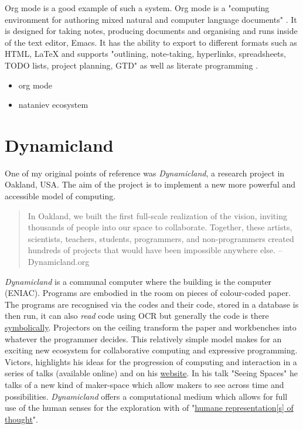 \documentclass[12pt]{report}
\begin{document}
Org mode is a good example of such a system. Org mode is a "computing
environment for authoring mixed natural and computer language documents"
\cite{Schulte:Davison:Dye:Dominik:2011:JSSOBK:v46i03}. It is designed for taking
notes, producing documents and organising and runs inside of the text editor,
Emacs. It has the ability to export to different formats such as HTML, \LaTeX{} and
supports "outlining, note-taking, hyperlinks, spreadsheets, TODO lists, project
planning, GTD" as well as literate programming
\cite{Schulte:Davison:Dye:Dominik:2011:JSSOBK:v46i03}.

\begin{itemize}
\item org mode
\item nataniev ecosystem
\end{itemize}

\section{Dynamicland}
\label{sec:orgd3cc1be}

One of my original points of reference was \emph{Dynamicland}, a research project in
Oakland, USA. The aim of the project is to implement a new more powerful and
accessible model of computing.

\begin{quote}


In Oakland, we built the first full-scale realization of the vision, inviting
thousands of people into our space to collaborate. Together, these artists,
scientists, teachers, students, programmers, and non-programmers created
hundreds of projects that would have been impossible anywhere else.
-- Dynamicland.org 
\end{quote}


\emph{Dynamicland} is a communal computer where the building is the computer (ENIAC).
Programs are embodied in the room on pieces of colour-coded paper. The programs
are recognised via the codes and their code, stored in a database is then run,
it can also \emph{read} code using OCR but generally the code is there \href{https://thenewstack.io/dynamicland-rethinks-computer-interfaces/}{symbolically}.
Projectors on the ceiling transform the paper and workbenches into whatever the
programmer decides. This relatively simple model makes for an exciting new
ecosystem for collaborative computing and expressive programming. Victors,
highlights his ideas for the progression of computing and interaction in a
series of talks (available online) and on his \href{http://worrydream.com}{website}. In his talk "Seeing
Spaces" he talks of a new kind of maker-space which allow makers to see across
time and possibilities. \emph{Dynamicland} offers a computational medium which allows
for full use of the human senses for the exploration with of "\href{https://vimeo.com/115154289}{humane
representation[s] of thought}". \cite{VictorKayDynamicLand} \\
\end{document}
